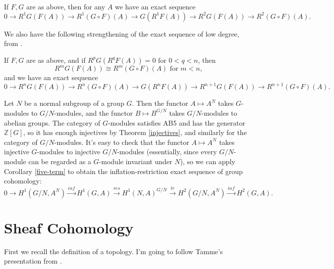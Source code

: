 \begin{cor}\label{five-term} If $F,G$ are as above, then for any $A$ we have an exact sequence
\[
0 \rightarrow R^1G(F(A)) \rightarrow R^1(G\circ F)(A) \rightarrow G(R^1F(A)) \rightarrow R^2G(F(A)) \rightarrow R^2(G\circ F)(A).
\]
\end{cor}

We also have the following strengthening of the exact sequence of low degree, from \cite{etale}.

\begin{cor}\label{degenerate} If $F,G$ are as above, and if $R^pG(R^qF(A)) = 0$ for $0 < q < n$, then
\[
R^mG(F(A)) \cong R^m(G\circ F)(A) \mbox{ for } m < n,
\]
and we have an exact sequence
\[
0 \rightarrow R^nG(F(A)) \rightarrow R^n(G\circ F)(A) \rightarrow G(R^nF(A)) \rightarrow R^{n+1}G(F(A)) \rightarrow R^{n+1}(G\circ F)(A).
\]
\end{cor}

\begin{ex} Let $N$ be a normal subgroup of a group $G$. Then the functor $A \mapsto A^N$ takes $G$-modules to $G/N$-modules, and the functor $B \mapsto B^{G/N}$ takes $G/N$-modules to abelian groups. The category of $G$-modules satisfies AB5 and has the generator $\mathbb{Z}[G]$, so it has enough injectives by Theorem \ref{injectives}, and similarly for the category of $G/N$-modules. It's easy to check that the functor $A \mapsto A^N$ takes injective $G$-modules to injective $G/N$-modules (essentially, since every $G/N$-module can be regarded as a $G$-module invariant under $N$), so we can apply Corollary \ref{five-term} to obtain the inflation-restriction exact sequence of group cohomology:
\[
0 \rightarrow H^1(G/N,A^N) \stackrel{inf}{\longrightarrow} H^1(G,A) \stackrel{res}{\longrightarrow} H^1(N,A)^{G/N} \stackrel{tr}{\longrightarrow} H^2(G/N,A^N) \stackrel{inf}{\longrightarrow} H^2(G,A).
\]
\end{ex}

\section{Sheaf Cohomology}

First we recall the definition of a topology. I'm going to follow Tamme's presentation from \cite{etale}.

